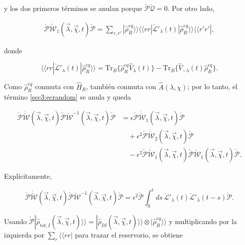 \begin{appendixs}
y los dos primeros términos se anulan porque \(\check{\mathcal{P}}\check{\mathcal{Q}}=0\). Por otro lado,

\begin{align*}
\check{\mathcal{P}}\dot{\check{\mathcal{W}}}_{1}(\vec{\lambda},\vec{\chi},t)\check{\mathcal{P}} = \sum_{r,r'}|\hat{\rho}^{eq}_{R} \rangle \rangle \langle \langle rr| \check{\mathcal{L}}'_{\lambda}(t)|\hat{\rho}_{R}^{eq}\rangle \rangle \langle \langle r'r'|,
\end{align*}

donde

\begin{equation}
\langle \langle rr|\check{\mathcal{L}}'_{\lambda}(t)|\hat{\rho}_{R}^{eq}\rangle \rangle  = \text{Tr}_{B}\{\hat{\rho}^{eq}_{R}\hat{V}_{\lambda}(t)\} - \text{Tr}_{B}\{\hat{V}_{-\lambda}(t)\hat{\rho}^{eq}_{R}\}.
\label{sec3:ecrandom}
\end{equation}

Como \(\hat{\rho}_{R}^{eq}\) conmuta con \(\hat{H}_{R}\), también conmuta con \(\hat{A}(\lambda,\chi)\); por lo tanto, el término \eqref{sec3:ecrandom} se anula y queda

\begin{align*}
\check{\mathcal{P}}\dot{\check{\mathcal{W}}}(\vec{\lambda},\vec{\chi},t)\check{\mathcal{P}}\check{\mathcal{W}}^{-1}(\vec{\lambda},\vec{\chi},t)\check{\mathcal{P}} &= \epsilon \check{\mathcal{P}}\dot{\check{\mathcal{W}}}_{1}(\vec{\lambda},\vec{\chi},t)\check{\mathcal{P}} \\
&\quad + \epsilon^{2}\check{\mathcal{P}}\dot{\check{\mathcal{W}}}_{2}(\vec{\lambda},\vec{\chi},t)\check{\mathcal{P}} \\
&\quad - \epsilon^{2}\check{\mathcal{P}}\dot{\check{\mathcal{W}}}_{1}(\vec{\lambda},\vec{\chi},t)\check{\mathcal{P}}  \check{\mathcal{W}}_{1}(\vec{\lambda},\vec{\chi},t) \check{\mathcal{P}} .
\end{align*}

Explícitamente,

\begin{equation*}
\check{\mathcal{P}}\dot{\check{\mathcal{W}}}(\vec{\lambda},\vec{\chi},t)\check{\mathcal{P}}\check{\mathcal{W}}^{-1}(\vec{\lambda},\vec{\chi},t)\check{\mathcal{P}} = \epsilon^{2}\check{\mathcal{P}}\int_{0}^{t}ds\, \check{\mathcal{L}}'_{\lambda}(t)\check{\mathcal{L}}'_{\lambda}(t-s)\check{\mathcal{P}} .
\end{equation*}

Usando \(\check{\mathcal{P}}|\dot{\hat{\rho}}_{tot,I}(\vec{\lambda},\vec{\chi},t)\rangle\rangle = |\dot{\hat{\rho}}_{IS}(\vec{\lambda},\vec{\chi},t)\rangle\rangle \otimes |\hat{\rho}_{R}^{eq}\rangle\rangle\) y multiplicando por la izquierda por \(\sum_{r}\langle\langle rr|\) para trazar el reservorio, se obtiene


\end{appendixs}
